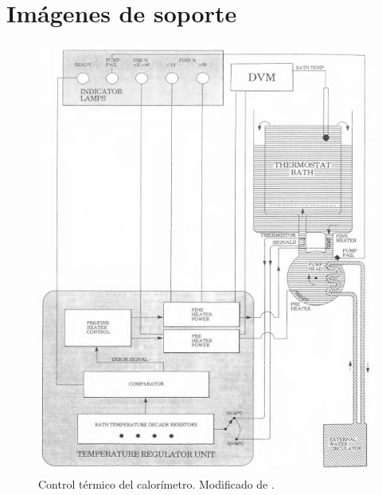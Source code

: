 
%




\chapter{Imágenes de soporte}\label{anx: imagenes}
	\begin{figure}[!h]
		\centering
		\includegraphics[width =\linewidth]{Figures/controlTemperatura}
		\caption{Control t\'ermico del calor\'imetro. Modificado de \cite{Suurkuusk}.}
		\label{fig: controlTermico}
	\end{figure}

